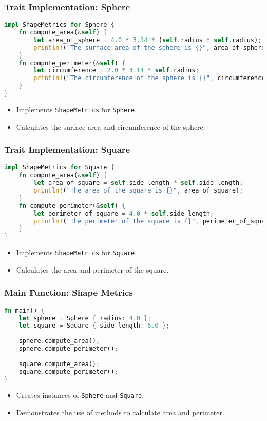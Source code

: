 \documentclass[aspectratio=169, table]{beamer}
\begin{document}
\begin{frame}[fragile]
\frametitle{Trait Implementation: Sphere}
\vspace{15pt}
\begin{lstlisting}[language=Rust]
impl ShapeMetrics for Sphere {
	fn compute_area(&self) {
		let area_of_sphere = 4.0 * 3.14 * (self.radius * self.radius);
		println!("The surface area of the sphere is {}", area_of_sphere);
	}
	fn compute_perimeter(&self) {
		let circumference = 2.0 * 3.14 * self.radius;
		println!("The circumference of the sphere is {}", circumference);
	}
}
\end{lstlisting}
\begin{itemize}
\item Implements \texttt{ShapeMetrics} for \texttt{Sphere}.
\item Calculates the surface area and circumference of the sphere.
\end{itemize}
\end{frame}

\begin{frame}[fragile]
\frametitle{Trait Implementation: Square}
\vspace{20pt}
\begin{lstlisting}[language=Rust]
impl ShapeMetrics for Square {
	fn compute_area(&self) {
		let area_of_square = self.side_length * self.side_length;
		println!("The area of the square is {}", area_of_square);
	}
	fn compute_perimeter(&self) {
		let perimeter_of_square = 4.0 * self.side_length;
		println!("The perimeter of the square is {}", perimeter_of_square);
	}
}
\end{lstlisting}
\begin{itemize}
\item Implements \texttt{ShapeMetrics} for \texttt{Square}.
\item Calculates the area and perimeter of the square.
\end{itemize}
\end{frame}


\begin{frame}[fragile]
\frametitle{Main Function: Shape Metrics}
\vspace{20pt}
\begin{lstlisting}[language=Rust]
fn main() {
	let sphere = Sphere { radius: 4.0 };
	let square = Square { side_length: 6.0 };
	
	sphere.compute_area();
	sphere.compute_perimeter();
	
	square.compute_area();
	square.compute_perimeter();
}
\end{lstlisting}
\begin{itemize}
\item Creates instances of \texttt{Sphere} and \texttt{Square}.
\item Demonstrates the use of methods to calculate area and perimeter.
\end{itemize}
\end{frame}
\end{document}
